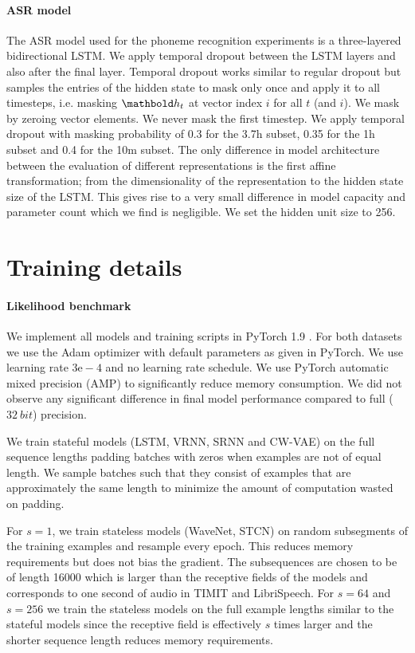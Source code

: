 {\paragraph{ASR model}
The ASR model used for the phoneme recognition experiments is a three-layered bidirectional LSTM. We apply temporal dropout between the LSTM layers and also after the final layer. Temporal dropout works similar to regular dropout but samples the entries of the hidden state to mask only once and apply it to all timesteps, i.e. masking $\hb_{t}$ at vector index $i$ for all $t$ (and $i$). 
We mask by zeroing vector elements. We never mask the first timestep. 
We apply temporal dropout with masking probability of 0.3 for the 3.7h subset, 0.35 for the 1h subset and 0.4 for the 10m subset. 
The only difference in model architecture between the evaluation of different representations is the first affine transformation; from the dimensionality of the representation to the hidden state size of the LSTM. This gives rise to a very small difference in model capacity and parameter count which we find is negligible. We set the hidden unit size to 256. 


\section{Training details}\label{app: training details}
\paragraph{Likelihood benchmark}
We implement all models and training scripts in PyTorch 1.9 \parencite{paszke_automatic_2017}.
For both datasets we use the Adam optimizer \parencite{kingma_adam_2015} with default parameters as given in PyTorch. We use learning rate $3\text{e}-4$ and no learning rate schedule.
We use PyTorch automatic mixed precision (AMP) to significantly reduce memory consumption. We did not observe any significant difference in final model performance compared to full ($\SI{32}{bit}$) precision.

We train stateful models (LSTM, VRNN, SRNN and CW-VAE) on the full sequence lengths padding batches with zeros when examples are not of equal length. We sample batches such that they consist of examples that are approximately the same length to minimize the amount of computation wasted on padding.

For $s=1$, we train stateless models (WaveNet, STCN) on random subsegments of the training examples and resample every epoch. This reduces memory requirements but does not bias the gradient. The subsequences are chosen to be of length 16000 which is larger than the receptive fields of the models and corresponds to one second of audio in TIMIT and LibriSpeech. 
For $s=64$ and $s=256$ we train the stateless models on the full example lengths similar to the stateful models since the receptive field is effectively $s$ times larger and the shorter sequence length reduces memory requirements.

}
